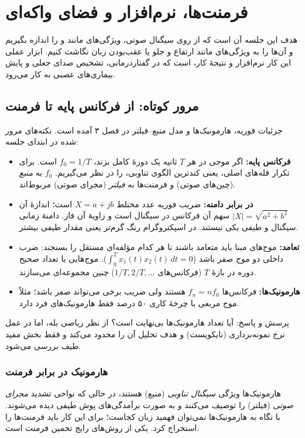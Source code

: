 \chapter{فرمنت‌ها، نرم‌افزار  و فضای واکه‌ای}

هدف این جلسه آن است که از روی سیگنال صوتی، ویژگی‌های  مانند  و  را اندازه بگیریم و آن‌ها را به ویژگی‌های  مانند ارتفاع و جلو یا عقب‌بودن زبان نگاشت کنیم. ابزار عملی این کار نرم‌افزار  و نتیجهٔ کار،  است که در گفتاردرمانی، تشخیص صدای جعلی و پایش بیماری‌های عصبی به کار می‌رود.

\section{مرور کوتاه: از فرکانس پایه تا فرمنت}
جزئیات فوریه، هارمونیک‌ها و مدل منبع–فیلتر در فصل ۳ آمده است. نکته‌های مرور شده در ابتدای جلسه:

\begin{itemize}
  \item \textbf{فرکانس پایه:} اگر موجی در هر $T$ ثانیه یک دورهٔ کامل بزند، $f_0=1/T$ است. برای  تکرار قله‌های اصلی، یعنی کندترین الگوی تناوبی، را در نظر می‌گیریم. $f_0$ به \emph{منبع} (چین‌های صوتی) و فرمنت‌ها به \emph{فیلتر} (مجرای صوتی) مربوط‌اند.
  \item \textbf{ در برابر دامنه:} ضریب فوریه عدد مختلط $X=a+jb$ است؛ اندازهٔ آن $|X|=\sqrt{a^2+b^2}$ سهم آن فرکانس در سیگنال است و زاویهٔ آن فاز. دامنهٔ زمانی سیگنال و  طیفی یکی نیستند. در اسپکتروگرام رنگ گرم‌تر یعنی مقدار طیفی بیشتر.
  \item \textbf{تعامد:} موج‌های مبنا باید متعامد باشند تا هر کدام مؤلفه‌ای مستقل را بسنجند: ضرب داخلی دو موج صفر باشد ($\int_0^T x_1(t)x_2(t)\,dt=0$). موج‌هایی با تعداد صحیح دوره در بازهٔ $T$ (فرکانس‌های $1/T,2/T,\dots$) چنین مجموعه‌ای می‌سازند.
  \item \textbf{هارمونیک‌ها:} فرکانس‌ها $f_n=nf_0$ هستند ولی ضریب برخی می‌تواند صفر باشد؛ مثلاً موج مربعی با چرخهٔ کاری ۵۰ درصد فقط هارمونیک‌های فرد دارد.
\end{itemize}

\begin{exambox}{پرسش و پاسخ: آیا تعداد هارمونیک‌ها بی‌نهایت است؟}
از نظر ریاضی بله، اما در عمل نرخ نمونه‌برداری (نایکویست) و هدف تحلیل آن را محدود می‌کند و فقط بخش مفید طیف بررسی می‌شود.
\end{exambox}

\subsection{هارمونیک در برابر فرمنت}
هارمونیک‌ها ویژگی \emph{سیگنال تناوبی} (منبع) هستند، در حالی که  نواحی تشدید \emph{مجرای صوتی} (فیلتر) را توصیف می‌کنند و به صورت برآمدگی‌های پوش طیفی دیده می‌شوند. با نگاه به هارمونیک‌ها نمی‌توان فهمید زبان کجاست؛ برای این کار باید فرمنت‌ها را استخراج کرد. یکی از روش‌های رایج تخمین فرمنت  است.

